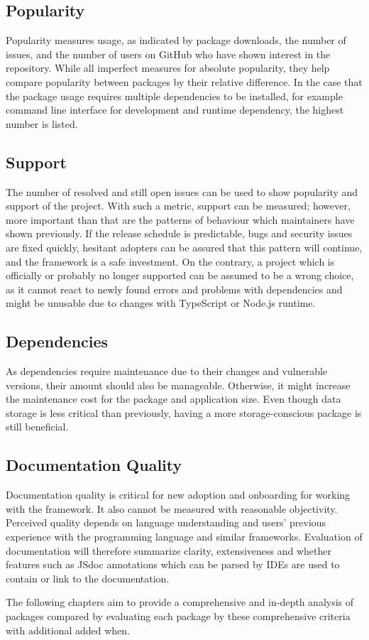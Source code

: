 \subsection{Popularity}

Popularity measures usage, as indicated by package downloads, the number of
issues, and the number of users on GitHub who have shown interest in the
repository. While all imperfect measures for absolute popularity, they help
compare popularity between packages by their relative difference. In the case
that the package usage requires multiple dependencies to be installed, for
example command line interface for development and runtime dependency, the
highest number is listed.

\subsection{Support}

The number of resolved and still open issues can be used to show popularity and
support of the project. With such a metric, support can be measured; however,
more important than that are the patterns of behaviour which maintainers have
shown previously. If the release schedule is predictable, bugs and security
issues are fixed quickly, hesitant adopters can be assured that this pattern
will continue, and the framework is a safe investment. On the contrary, a
project which is officially or probably no longer supported can be assumed to be
a wrong choice, as it cannot react to newly found errors and problems with
dependencies and might be unusable due to changes with TypeScript or Node.js
runtime.

\subsection{Dependencies}

As dependencies require maintenance due to their changes and vulnerable
versions, their amount should also be manageable. Otherwise, it might increase
the maintenance cost for the package and application size. Even though data
storage is less critical than previously, having a more storage-conscious
package is still beneficial.

\subsection{Documentation Quality}

Documentation quality is critical for new adoption and onboarding for working
with the framework. It also cannot be measured with reasonable objectivity.
Perceived quality depends on language understanding and users’ previous
experience with the programming language and similar frameworks. Evaluation of
documentation will therefore summarize clarity, extensiveness and whether
features such as JSdoc annotations \cite{Typescript-jsdoc} which can be parsed
by IDEs are used to contain or link to the documentation.


The following chapters aim to provide a comprehensive and in-depth analysis of
packages compared by evaluating each package by these comprehensive criteria
with additional added when.
